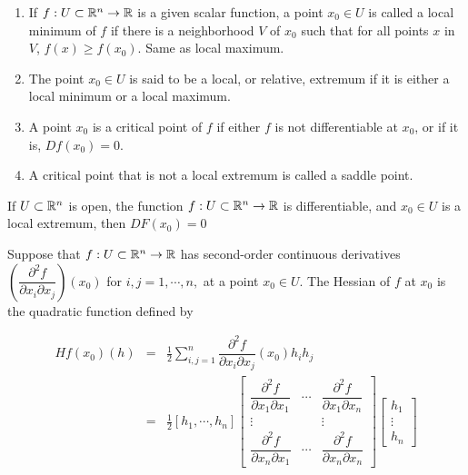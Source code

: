 \begin{defn}
	\begin{enumerate}[wide,label = $\bullet$]
		\item If $f:U \subset \mathbb{R}^n \rightarrow \mathbb{R}$ is a given scalar function, a point $x_0 \in U$ is called a local minimum of $f$ if there is a neighborhood $V$ of $x_0$ such that for all points $x$ in $V$, $f(x) \geq f(x_0)$. Same as local maximum.
		\item The point $x_0 \in U$ is said to be a local, or relative, extremum if it is either a local minimum or a local maximum.
		\item A point $x_0$ is a critical point of $f$ if either $f$ is not differentiable at $x_0$, or if it is, $Df(x_0) = 0$.
		\item A critical point that is not a local extremum is called a saddle point.	
		\end{enumerate}
\end{defn}

\begin{thm*}
	If $U \subset \mathbb{R}^n$ is open, the function $f: U \subset \mathbb{R}^n \rightarrow \mathbb{R}$ is differentiable, and $x_0 \in U$ is a local extremum, then $DF(x_0) = 0$	
\end{thm*}

\begin{defn}
	Suppose that $f: U \subset \mathbb{R}^n \rightarrow \mathbb{R}$ has second-order continuous derivatives $\left( \dfrac{\partial^2 f}{\partial x_i \partial x_j}  \right) (x_0)$ for $i,j = 1,\cdots , n ,$ at a point $x_0 \in U.$ The Hessian of $f$ at $x_0$ is the quadratic function defined by
	
	\begin{eqnarray*}
	Hf(x_0)(h) &=& \frac{1}{2} \sum^{n}_{i,j = 1}\dfrac{\partial^2 f}{\partial x_i \partial x_j}(x_0)h_ih_j\\
	&=& \frac{1}{2}[h_1,\cdots,h_n]\left[\begin{matrix} \dfrac{\partial^2 f}{\partial x_1 \partial x_1} & \cdots & \dfrac{\partial^2 f}{\partial x_1 \partial x_n} \\ \vdots & & \vdots \\ \dfrac{\partial^2 f}{\partial x_n \partial x_1} & \cdots & \dfrac{\partial^2 f}{\partial x_n \partial x_n}\end{matrix}\right] \left[ \begin{matrix} h_1\\ \vdots \\ h_n \end{matrix}\right]
	\end{eqnarray*}
\end{defn}

